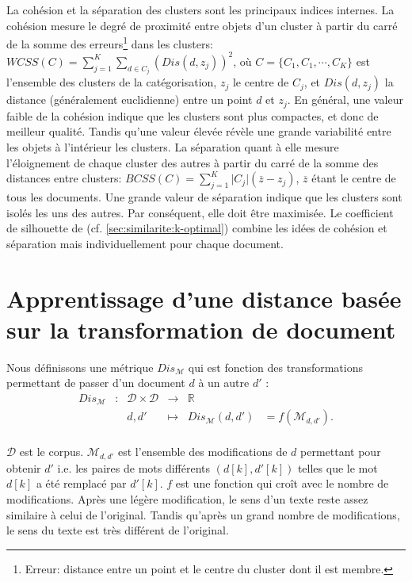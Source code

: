  La cohésion et la séparation des clusters sont les principaux indices internes. La cohésion mesure le degré de proximité entre objets d'un cluster à partir du carré de la somme des erreurs\footnote{Erreur: distance entre un point et le centre du cluster dont il est membre.} dans les clusters: $WCSS(C) = \sum\limits_{j=1}^K\sum\limits_{d \in C_j} (Dis(d, z_j))^2$, où $C = \lbrace C_1, C_1, \cdots, C_K \rbrace$ est l'ensemble des clusters de la catégorisation, $z_j$ le centre de $C_j$, et $Dis(d,z_j)$ la distance (généralement euclidienne) entre un point $d$ et $z_j$. En général, une valeur faible de la cohésion indique que les clusters sont plus compactes, et donc de meilleur qualité. Tandis qu'une valeur élevée révèle une grande variabilité entre les objets à l'intérieur les clusters. La séparation quant à elle mesure l'éloignement de chaque cluster des autres à partir du carré de la somme des distances entre clusters: $BCSS(C) = \sum\limits_{j = 1}^{K} \vert C_j \vert (\overline{z} - z_j)$, 
  $\overline{z}$ étant le centre de tous les documents.
  Une grande valeur de séparation indique que les clusters sont isolés les uns des autres. Par conséquent, elle doit être maximisée. Le coefficient de silhouette de \citet{rousseeuw1987silhouetteclusternumber} (cf. \ref{sec:similarite:k-optimal})  combine les idées de cohésion et séparation mais individuellement pour chaque document.

\section{Apprentissage d'une distance basée sur la transformation de document}
Nous définissons une métrique $Dis_\mathcal{M}$ qui est fonction des transformations permettant de passer d'un document $d$ à un autre $d'$ :
\begin{equation}
\begin{array}{cccccc}
Dis_\mathcal{M} & : & \mathcal{D} \times \mathcal{D} & \to & \mathbb{R} & \\
& & d, d' & \mapsto & Dis_{\mathcal{M}}(d, d') & = f(\mathcal{M}_{d, d'}). \\
\end{array} \label{eq:similarite:distance-modif}
\end{equation}

$\mathcal{D}$ est le corpus. $\mathcal{M}_{d, d'}$ est l'ensemble des modifications de $d$ permettant pour obtenir $d'$ i.e. les paires de mots différents $(d[k], d'[k])$ telles que le mot $d[k]$ a été remplacé par $d'[k]$. $f$ est une fonction qui croît avec le nombre de modifications. Après une légère modification, le sens d'un texte reste assez similaire à celui de l'original. Tandis qu'après un grand nombre de modifications, le sens du texte est très différent de l'original. 

